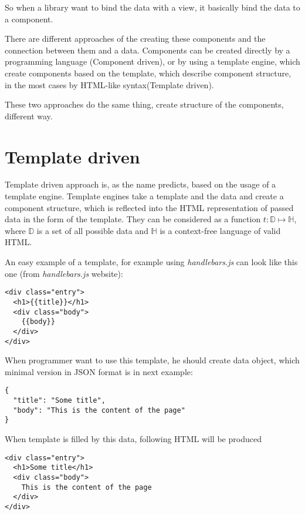 \documentclass[oneside, 12pt]{book}
\begin{document}
So when a library want to bind the data with a view, it basically bind the data to a component.

There are different approaches of the creating these components and the connection between them and a data. 
Components can be created directly by a programming language (Component driven), 
or by using a template engine, which create components based on the template, 
which describe component structure, in the most cases by HTML-like syntax(Template driven).

These two approaches do the same thing, create structure of the components, different way.

\section{Template driven}\label{sec:existing-template}

  Template driven approach is, as the name predicts, based on the usage of a template engine. 
  Template engines take a template and the data and create a component structure, 
  which is reflected into the HTML representation of passed data in the form of the template. 
  They can be considered as a function $t:\mathbb D\mapsto\mathbb H$, 
  where $\mathbb D$ is a set of all possible data and $\mathbb H$ is a context-free language of valid HTML.

  An easy example of a template, for example using \textit{handlebars.js} can look like this one (from \textit{handlebars.js} website):
\begin{verbatim}
<div class="entry">
  <h1>{{title}}</h1>
  <div class="body">
    {{body}}
  </div>
</div>
\end{verbatim}



  When programmer want to use this template, he should create data object, which minimal version in JSON format is in next example:
\begin{verbatim}
{
  "title": "Some title",
  "body": "This is the content of the page"
}
\end{verbatim}



  When template is filled by this data, following HTML will be produced
\begin{verbatim}
<div class="entry">
  <h1>Some title</h1>
  <div class="body">
    This is the content of the page
  </div>
</div>
\end{verbatim}
\end{document}
